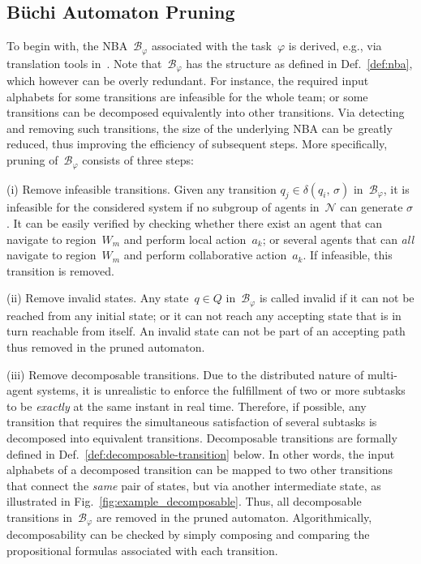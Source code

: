 \subsection{B\"{u}chi Automaton Pruning}
\label{subsubsec:NBA-pruning}
To begin with, the NBA~$\mathcal{B}_{\varphi}$ associated with the task~$\varphi$
is derived, e.g., via translation tools in~\citep{gastin2001fast}.
Note that~$\mathcal{B}_{\varphi}$ has the structure as defined in Def.~\ref{def:nba},
which however can be overly redundant.
For instance, the required input alphabets for some transitions are infeasible for the whole team;
or some transitions can be decomposed equivalently
into other transitions.
Via detecting and removing such transitions, the size of the underlying NBA
can be greatly reduced, thus improving the efficiency of subsequent steps.
More specifically, pruning of~$\mathcal{B}_{\varphi}$ consists of three steps:

(i) Remove infeasible transitions.
Given any transition $q_j \in \delta(q_i,\, \sigma)$ in~$\mathcal{B}_{\varphi}$,
it is infeasible for the considered system if
no subgroup of agents in~$\mathcal{N}$ can generate $\sigma$.
It can be easily verified by checking whether there exist an agent that can navigate to region~$W_m$ and perform local action~$a_k$;
or several agents that can \emph{all} navigate to region~$W_m$ and perform collaborative action~$a_k$.
If infeasible, this transition is removed.

(ii) Remove invalid states.
Any state~$q\in Q$ in~$\mathcal{B}_{\varphi}$ is called invalid
if it can not be reached from any initial state;
or it can not reach any accepting state that is in turn reachable from itself.
An invalid state can not be part of an accepting path thus removed in the pruned automaton.

(iii) Remove decomposable transitions.
Due to the distributed nature of multi-agent systems,
it is unrealistic to enforce the fulfillment of two or more subtasks
to be \emph{exactly} at the same instant in real time.
Therefore, if possible,
any transition that requires the simultaneous satisfaction of several subtasks is decomposed into equivalent transitions.
Decomposable transitions are formally defined in
Def.~\ref{def:decomposable-transition} below.
In other words, the input alphabets of a decomposed transition can be mapped to
two other transitions that connect the \emph{same} pair of states,
but via another intermediate state, as illustrated in Fig.~\ref{fig:example_decomposable}.
Thus, all decomposable transitions in~$\mathcal{B}_{\varphi}$ are removed in the pruned automaton.
Algorithmically, decomposability can be checked by simply composing and comparing the
propositional formulas associated with each transition.

